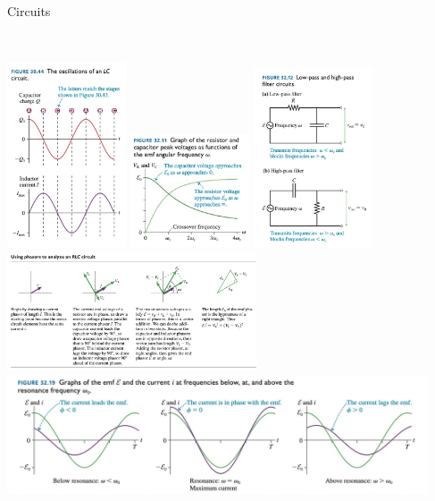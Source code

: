 \documentclass{article}
\begin{document}
\begin{center}
\begin{section}{Circuits}
\begin{tabular}{|c|c|}
		 \hline
	 \end{tabular}
	 \\
	 \includegraphics[width=100pt]{final_cheet_sheet_resources/knhwzgniatxeirlvrdqvgqrgyvbpycxs.jpg}
	 \includegraphics[width=100pt]{final_cheet_sheet_resources/mqbfppsrjecahghjqzghukiiyymfwtox.jpg}
	 \includegraphics[width=100pt]{final_cheet_sheet_resources/bbkpguezzmblocutfwvwjptztmtqsieb.jpg}
	 \\
	 \includegraphics[height=100pt]{final_cheet_sheet_resources/iqzochavmjtzuescfokiyycliupdpttn.jpg}
	 \includegraphics[height=100pt]{final_cheet_sheet_resources/clxkvexujwruofnqyneeegabhuaeszyq.jpg}

	\end{section}
\end{center}
\end{document}
